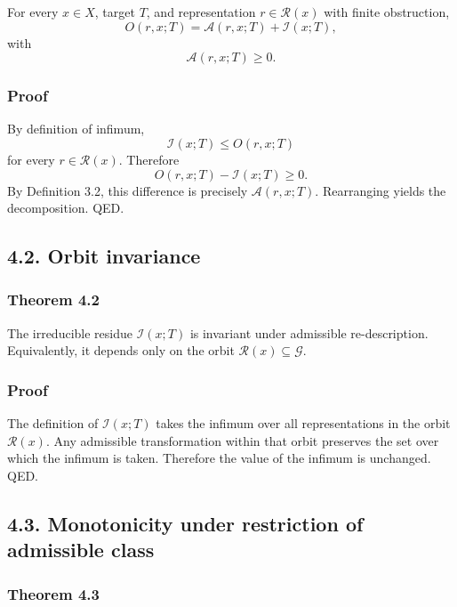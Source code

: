 \documentclass[
]{article}
\begin{document}
For every \(x \in X\), target \(T\), and representation
\(r \in \mathcal{R}(x)\) with finite obstruction, \[
O(r,x;T) = \mathcal{A}(r,x;T) + \mathcal{I}(x;T),
\] with \[
\mathcal{A}(r,x;T) \ge 0.
\]

\subsubsection{Proof}\label{proof}

By definition of infimum, \[
\mathcal{I}(x;T) \le O(r,x;T)
\] for every \(r \in \mathcal{R}(x)\). Therefore \[
O(r,x;T) - \mathcal{I}(x;T) \ge 0.
\] By Definition 3.2, this difference is precisely
\(\mathcal{A}(r,x;T)\). Rearranging yields the decomposition. QED.

\subsection{4.2. Orbit invariance}\label{orbit-invariance}

\subsubsection{Theorem 4.2}\label{theorem-4.2}

The irreducible residue \(\mathcal{I}(x;T)\) is invariant under
admissible re-description. Equivalently, it depends only on the orbit
\(\mathcal{R}(x) \subseteq \mathcal{G}\).

\subsubsection{Proof}\label{proof-1}

The definition of \(\mathcal{I}(x;T)\) takes the infimum over all
representations in the orbit \(\mathcal{R}(x)\). Any admissible
transformation within that orbit preserves the set over which the
infimum is taken. Therefore the value of the infimum is unchanged. QED.

\subsection{4.3. Monotonicity under restriction of admissible
class}\label{monotonicity-under-restriction-of-admissible-class}

\subsubsection{Theorem 4.3}\label{theorem-4.3}
\end{document}
